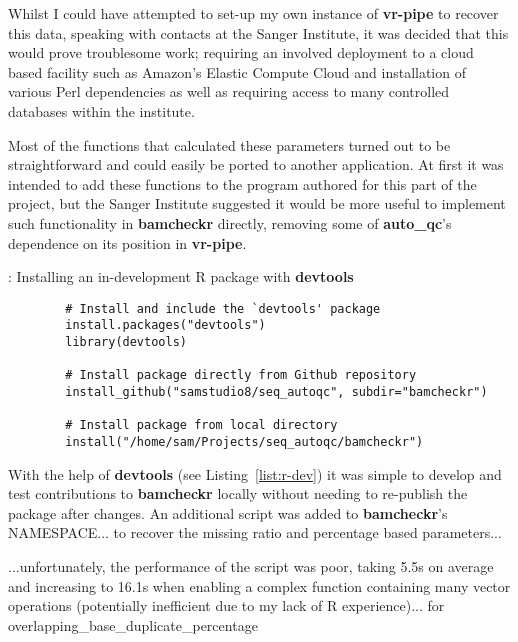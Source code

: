
Whilst I could have attempted to set-up my own instance of \textbf{vr-pipe} to
recover this data, speaking with contacts at the Sanger Institute, it was
decided that this would prove troublesome work; requiring an involved
deployment to a cloud based facility such as Amazon's Elastic Compute Cloud and
installation of various Perl dependencies as well as requiring access to many
controlled databases within the institute.

Most of the functions that calculated these parameters turned out to be
straightforward and could easily be ported to another application. At first
it was intended to add these functions to the program authored for this part of
the project, but the Sanger Institute suggested it would be more useful to
implement such functionality in \textbf{bamcheckr} directly, removing some of
\textbf{auto\_qc}'s dependence on its position in \textbf{vr-pipe}.

\begin{listing}[H]
    \caption[r-dev]{: Installing an in-development R package with \textbf{devtools}}
    \label{list:r-dev}
    \begin{verbatim}
        # Install and include the `devtools' package
        install.packages("devtools")
        library(devtools)

        # Install package directly from Github repository
        install_github("samstudio8/seq_autoqc", subdir="bamcheckr")

        # Install package from local directory
        install("/home/sam/Projects/seq_autoqc/bamcheckr")

    \end{verbatim}
\end{listing}

With the help of \textbf{devtools}\citep{man:devtools} (see
Listing~\ref{list:r-dev}) it was simple to develop and test contributions to
\textbf{bamcheckr} locally without needing to re-publish the package after
changes. An additional script was added to \textbf{bamcheckr}'s NAMESPACE... to
recover the missing ratio and percentage based parameters...

...unfortunately, the performance of the script was poor, taking 5.5s on average
and increasing to 16.1s when enabling a complex function containing many vector
operations (potentially inefficient due to my lack of R experience)...
for overlapping\_base\_duplicate\_percentage

